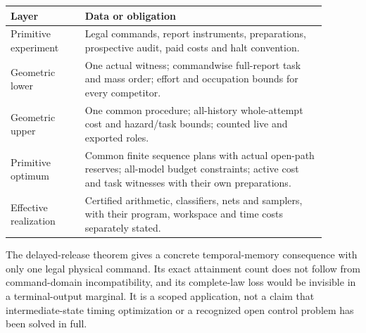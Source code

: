 \begin{center}\small
\begin{tabular}{p{0.21\linewidth}p{0.68\linewidth}}
\toprule
Layer & Data or obligation\\\midrule
Primitive experiment & Legal commands, report instruments, preparations, prospective audit, paid costs and halt convention.\\
Geometric lower & One actual witness; commandwise full-report task and mass order; effort and occupation bounds for every competitor.\\
Geometric upper & One common procedure; all-history whole-attempt cost and hazard/task bounds; counted live and exported roles.\\
Primitive optimum & Common finite sequence plans with actual open-path reserves; all-model budget constraints; active cost and task witnesses with their own preparations.\\
Effective realization & Certified arithmetic, classifiers, nets and samplers, with their program, workspace and time costs separately stated.\\
\bottomrule
\end{tabular}
\end{center}
The delayed-release theorem gives a concrete temporal-memory consequence with only one legal physical command. Its exact attainment count does not follow from command-domain incompatibility, and its complete-law loss would be invisible in a terminal-output marginal. It is a scoped application, not a claim that intermediate-state timing optimization or a recognized open control problem has been solved in full.
